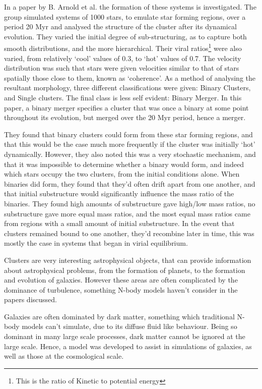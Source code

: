 \documentclass[a4paper,10pt]{article}
\begin{document}
In a paper by B. Arnold et al. the formation of these systems is investigated\cite{ClusterBinary}. The group simulated systems of 1000 stars, to emulate star forming regions, over a period 20 Myr and analysed the structure of the cluster after its dynamical evolution. They varied the initial degree of sub-structuring, as to capture both smooth distributions, and the more hierarchical. Their viral ratios\footnote{This is the ratio of Kinetic to potential energy} were also varied, from relatively `cool' values of 0.3, to `hot' values of 0.7. The velocity distribution was such that stars were given velocities similar to that of stars spatially those close to them, known as `coherence'. As a method of analysing the resultant morphology, three different classifications were given: Binary Clusters, and Single clusters. The final class is less self evident: Binary Merger. In this paper, a binary merger specifies a cluster that was once a binary at some point throughout its evolution, but merged over the 20 Myr period, hence a merger.

They found that binary clusters could form from these star forming regions, and that this would be the case much more frequently if the cluster was initially `hot' dynamically. However, they also noted this was a very stochastic mechanism, and that it was impossible to determine whether a binary would form, and indeed which stars occupy the two clusters, from the initial conditions alone. When binaries did form, they found that they'd often drift apart from one another, and that initial substructure would significantly influence the mass ratio of the binaries. They found high amounts of substructure gave high/low mass ratios, no substructure gave more equal mass ratios, and the most equal mass ratios came from regions with a small amount of initial substructure. In the event that clusters remained bound to one another, they'd recombine later in time, this was mostly the case in systems that began in virial equilibrium.

Clusters are very interesting astrophysical objects, that can provide information about astrophysical problems, from the formation of planets, to the formation and evolution of galaxies. However these areas are often complicated by the dominance of turbulence, something N-body models haven't consider in the papers discussed.

Galaxies are often dominated by dark matter, something which traditional N-body models can't simulate, due to its diffuse fluid like behaviour. Being so dominant in many large scale processes, dark matter cannot be ignored at the large scale. Hence, a model was developed to assist in simulations of galaxies, as well as those at the cosmological scale. 
\end{document}
